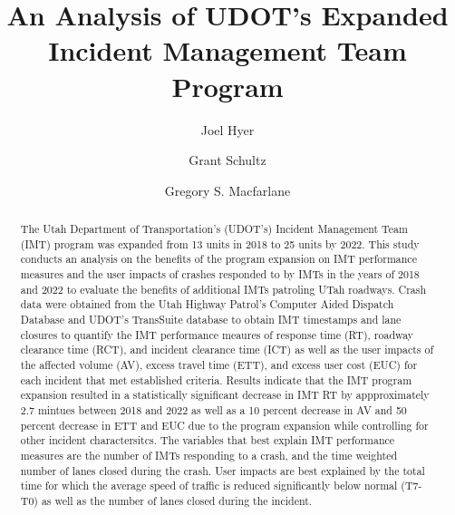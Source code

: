 \documentclass[
  letterpaper,
  authoryear]{elsarticle}
\begin{document}
\begin{frontmatter}
\title{An Analysis of UDOT's Expanded Incident Management Team Program}
\author[1]{Joel Hyer%
%
}

\author[1]{Grant Schultz%
%
}

\author[1]{Gregory S. Macfarlane%
%
}





        
\begin{abstract}
The Utah Department of Transportation's (UDOT's) Incident Management
Team (IMT) program was expanded from 13 units in 2018 to 25 units by
2022. This study conducts an analysis on the benefits of the program
expansion on IMT performance measures and the user impacts of crashes
responded to by IMTs in the years of 2018 and 2022 to evaluate the
benefits of additional IMTs patroling UTah roadways. Crash data were
obtained from the Utah Highway Patrol's Computer Aided Dispatch Database
and UDOT's TransSuite database to obtain IMT timestamps and lane
closures to quantify the IMT performance meaures of response time (RT),
roadway clearance time (RCT), and incident clearance time (ICT) as well
as the user impacts of the affected volume (AV), excess travel time
(ETT), and excess user cost (EUC) for each incident that met established
criteria. Results indicate that the IMT program expansion resulted in a
statistically significant decrease in IMT RT by appproximately 2.7
mintues between 2018 and 2022 as well as a 10 percent decrease in AV and
50 percent decrease in ETT and EUC due to the program expansion while
controlling for other incident charactersitcs. The variables that best
explain IMT performance measures are the number of IMTs responding to a
crash, and the time weighted number of lanes closed during the crash.
User impacts are best explained by the total time for which the average
speed of traffic is reduced significantly below normal (T7-T0) as well
as the number of lanes closed during the incident.
\end{abstract}





\end{frontmatter}
    
\end{document}
